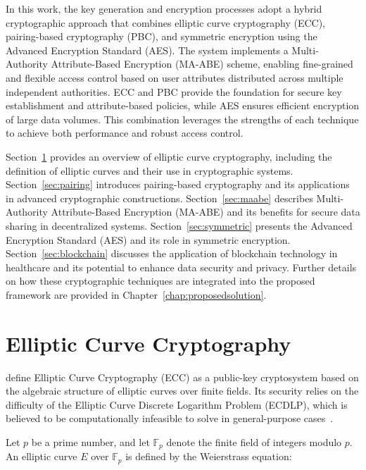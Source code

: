 \documentclass[cic,tc,english]{iiufrgs}
\begin{document}
    In this work, the key generation and encryption processes adopt a hybrid cryptographic approach that combines elliptic curve cryptography (ECC), pairing-based cryptography (PBC), and symmetric encryption using the Advanced Encryption Standard (AES). The system implements a Multi-Authority Attribute-Based Encryption (MA-ABE) scheme, enabling fine-grained and flexible access control based on user attributes distributed across multiple independent authorities. ECC and PBC provide the foundation for secure key establishment and attribute-based policies, while AES ensures efficient encryption of large data volumes. This combination leverages the strengths of each technique to achieve both performance and robust access control.



    Section~\ref{sec:ecc} provides an overview of elliptic curve cryptography, including the definition of elliptic curves and their use in cryptographic systems. Section~\ref{sec:pairing} introduces pairing-based cryptography and its applications in advanced cryptographic constructions. Section~\ref{sec:maabe} describes Multi-Authority Attribute-Based Encryption (MA-ABE) and its benefits for secure data sharing in decentralized systems. Section~\ref{sec:symmetric} presents the Advanced Encryption Standard (AES) and its role in symmetric encryption. Section~\ref{sec:blockchain} discusses the application of blockchain technology in healthcare and its potential to enhance data security and privacy. Further details on how these cryptographic techniques are integrated into the proposed framework are provided in Chapter~\ref{chap:proposedsolution}.
    

    \section{Elliptic Curve Cryptography}
        \label{sec:ecc}

        \citet{hankerson2004guide} define Elliptic Curve Cryptography (ECC) as a public-key cryptosystem based on the algebraic structure of elliptic curves over finite fields. Its security relies on the difficulty of the Elliptic Curve Discrete Logarithm Problem (ECDLP), which is believed to be computationally infeasible to solve in general-purpose cases~\citep{hankerson2004guide, koblitz1987elliptic}.

        Let $p$ be a prime number, and let $\mathbb{F}_p$ denote the finite field of integers modulo $p$. An elliptic curve $E$ over $\mathbb{F}_p$ is defined by the Weierstrass equation:
\end{document}
